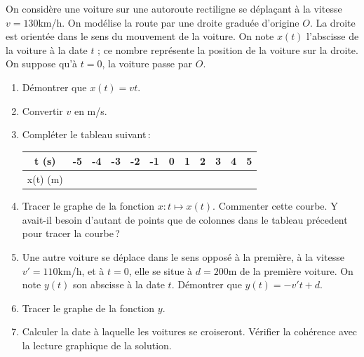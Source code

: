 			\begin{exo}
				On considère une voiture sur une autoroute rectiligne se déplaçant à la vitesse $v=130$km/h. On modélise la route par une droite graduée d'origine $O$. La droite est orientée dans le sens du mouvement de la voiture. On note $x(t)$ l'abscisse de la voiture à la date $t$ ; ce nombre représente la position de la voiture sur la droite. On suppose qu'à $t=0$, la voiture passe par $O$.
				\begin{enumerate}
					\item Démontrer que $x(t)=v t$.
					\item Convertir $v$ en m/s.
					\item Compléter le tableau suivant\,:

					\begin{tabular}{c|c|c|c|c|c|c|c|c|c|c|c}
						t (s) & -5 & -4& -3& -2& -1& 0& 1& 2& 3& 4& 5 \\
						\hline
						x(t) (m)& &   &   &    &   &  &  &  &  &  &  
					\end{tabular}

					\item Tracer le graphe de la fonction $x:t\mapsto x(t)$. Commenter cette courbe. Y avait-il besoin d'autant de points que de colonnes dans le tableau précedent pour tracer la courbe\,?
					\item Une autre voiture se déplace dans le sens opposé à la première, à la vitesse\\ $v'=110$km/h, et à $t=0$, elle se situe à $d=200$m de la première voiture. On note $y(t)$ son abscisse à la date $t$. Démontrer que $y(t)=-v't+d$. 
					\item Tracer le graphe de la fonction $y$. 
					\item Calculer la date à laquelle les voitures se croiseront. Vérifier la cohérence avec la lecture graphique de la solution.


				\end{enumerate}
			\end{exo}

